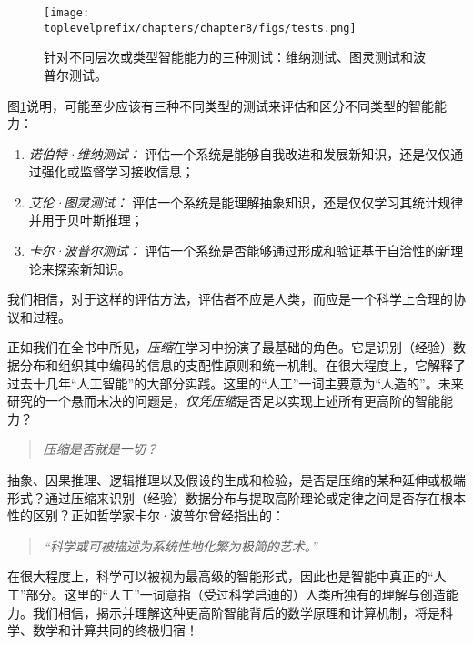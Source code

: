 \documentclass[../../book-main.tex]{subfiles}
\begin{document}
\begin{figure}[t]
    \centering
    \texttt{[image: \\toplevelprefix/chapters/chapter8/figs/tests.png]}
    \caption{针对不同层次或类型智能能力的三种测试：维纳测试、图灵测试和波普尔测试。}
    \label{fig:three-tests}
\end{figure}

图\ref{fig:three-tests}说明，可能至少应该有三种不同类型的测试来评估和区分不同类型的智能能力：
\begin{enumerate}
    \item {\em 诺伯特·维纳测试：} 评估一个系统是能够自我改进和发展新知识，还是仅仅通过强化或监督学习接收信息；
    \item {\em 艾伦·图灵测试：} 评估一个系统是能理解抽象知识，还是仅仅学习其统计规律并用于贝叶斯推理；
    \item {\em 卡尔·波普尔测试：} 评估一个系统是否能够通过形成和验证基于自洽性的新理论来探索新知识。
\end{enumerate}
我们相信，对于这样的评估方法，评估者不应是人类，而应是一个科学上合理的协议和过程。



正如我们在全书中所见，\textit{压缩}在学习中扮演了最基础的角色。它是识别（经验）数据分布和组织其中编码的信息的支配性原则和统一机制。在很大程度上，它解释了过去十几年“人工智能”的大部分实践。这里的“人工”一词主要意为“人造的”。未来研究的一个悬而未决的问题是，\textit{仅凭压缩}是否足以实现上述所有更高阶的智能能力？
\begin{quote}
\begin{center}
        {\em 压缩是否就是一切？}
\end{center}
\end{quote}
抽象、因果推理、逻辑推理以及假设的生成和检验，是否是压缩的某种延伸或极端形式？通过压缩来识别（经验）数据分布与提取高阶理论或定律之间是否存在根本性的区别？正如哲学家卡尔·波普尔曾经指出的：
\begin{quote}
    \begin{center}
    {\em “科学或可被描述为系统性地化繁为极简的艺术。”}
    \end{center}
\end{quote}
在很大程度上，科学可以被视为最高级的智能形式，因此也是智能中真正的“人工”部分。这里的“人工”一词意指（受过科学启迪的）人类所独有的理解与创造能力。我们相信，揭示并理解这种更高阶智能背后的数学原理和计算机制，将是科学、数学和计算共同的终极归宿！
\end{document}
